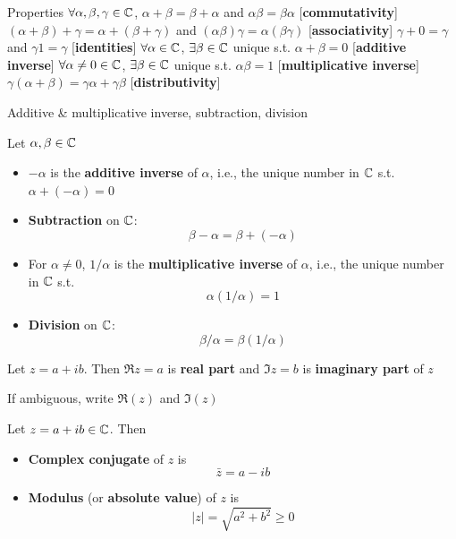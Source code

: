 \documentclass[aspectratio=169]{beamer}\usepackage[]{graphicx}\usepackage[]{xcolor}
\begin{document}
\begin{frame}{Properties}
	$\forall\alpha,\beta,\gamma\in\mathbb{C}$,
	\vfill
	$\alpha+\beta=\beta+\alpha$ and $\alpha\beta=\beta\alpha$ \hfill[\textbf{commutativity}]
	\vfill
	$(\alpha+\beta)+\gamma=\alpha+(\beta+\gamma)$ and $(\alpha\beta)\gamma=\alpha(\beta\gamma)$ \hfill[\textbf{associativity}]
	\vfill
	$\gamma+0=\gamma$ and $\gamma 1=\gamma$ \hfill[\textbf{identities}]
	\vfill
	$\forall\alpha\in\mathbb{C}$, $\exists\beta\in\mathbb{C}$ unique s.t. $\alpha+\beta=0$ \hfill[\textbf{additive inverse}]
	\vfill
	$\forall \alpha\neq 0\in\mathbb{C}$, $\exists\beta\in\mathbb{C}$ unique s.t. $\alpha\beta=1$ \hfill[\textbf{multiplicative inverse}]
	\vfill
	$\gamma(\alpha+\beta)=\gamma\alpha+\gamma\beta$ \hfill[\textbf{distributivity}]
\end{frame}


\begin{frame}{Additive \& multiplicative inverse, subtraction, division}
	\begin{definition}
		Let $\alpha,\beta\in\mathbb{C}$
		\begin{itemize}
			\item $-\alpha$ is the \textbf{additive inverse} of $\alpha$, i.e., the unique number in $\mathbb{C}$ s.t. $\alpha+(-\alpha)=0$
			\item \textbf{Subtraction} on $\mathbb{C}$:
			\[
			\beta-\alpha=\beta+(-\alpha)
			\]
			\item For $\alpha\neq 0$, $1/\alpha$ is the \textbf{multiplicative inverse} of $\alpha$, i.e., the unique number in $\mathbb{C}$ s.t.
			\[
			\alpha(1/\alpha)=1
			\]
			\item \textbf{Division} on $\mathbb{C}$:
			\[
			\beta/\alpha=\beta(1/\alpha)
			\]
		\end{itemize}
	\end{definition}
\end{frame}


\begin{frame}
	\begin{importantdefinition}
		Let $z=a+ib$. Then $\Re z=a$ is \textbf{real part} and $\Im z=b$ is \textbf{imaginary part} of $z$
	\end{importantdefinition}
	\vfill
	If ambiguous, write $\Re(z)$ and $\Im(z)$
	\vfill
	\begin{importantdefinition}
		Let $z=a+ib\in\mathbb{C}$. Then
		\begin{itemize}
			\item \textbf{Complex conjugate} of $z$ is
			\[
			\bar z = a-ib
			\]
			\item \textbf{Modulus} (or \textbf{absolute value}) of $z$ is
			\[
			|z|=\sqrt{a^2+b^2} \geq 0
			\]
		\end{itemize}
	\end{importantdefinition}
\end{frame}
\end{document}
